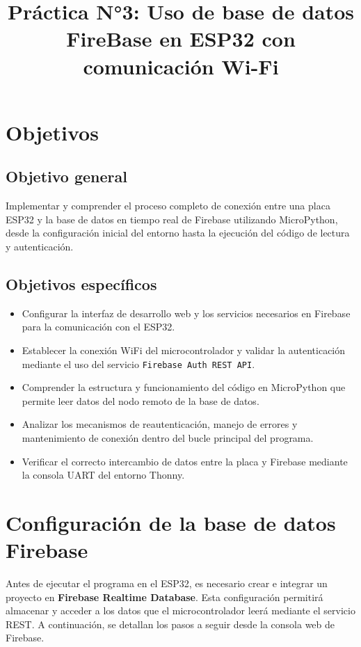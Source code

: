 \documentclass[a4paper,12pt]{article}
\title{Práctica N°3: Uso de base de datos FireBase en ESP32 con comunicación Wi-Fi}
\date{}
\begin{document}
\maketitle
\tableofcontents
\newpage

\section{Objetivos}

\subsection{Objetivo general}
Implementar y comprender el proceso completo de conexión entre una placa ESP32 y la base de datos en tiempo real de Firebase utilizando MicroPython, desde la configuración inicial del entorno hasta la ejecución del código de lectura y autenticación.

\subsection{Objetivos específicos}
\begin{itemize}
    \item Configurar la interfaz de desarrollo web y los servicios necesarios en Firebase para la comunicación con el ESP32.
    \item Establecer la conexión WiFi del microcontrolador y validar la autenticación mediante el uso del servicio \texttt{Firebase Auth REST API}.
    \item Comprender la estructura y funcionamiento del código en MicroPython que permite leer datos del nodo remoto de la base de datos.
    \item Analizar los mecanismos de reautenticación, manejo de errores y mantenimiento de conexión dentro del bucle principal del programa.
    \item Verificar el correcto intercambio de datos entre la placa y Firebase mediante la consola UART del entorno Thonny.
\end{itemize}

\section{Configuración de la base de datos Firebase}

Antes de ejecutar el programa en el ESP32, es necesario crear e integrar un proyecto en \textbf{Firebase Realtime Database}. Esta configuración permitirá almacenar y acceder a los datos que el microcontrolador leerá mediante el servicio REST. A continuación, se detallan los pasos a seguir desde la consola web de Firebase.
\end{document}
